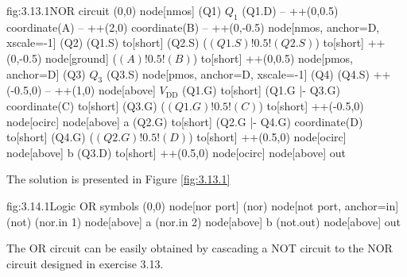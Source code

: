 \begin{circuit}{fig:3.13.1}{NOR circuit}
    (0,0) node[nmos] (Q1) {$Q_1$}
    (Q1.D) -- ++(0,0.5) coordinate(A)
    -- ++(2,0) coordinate(B)
    -- ++(0,-0.5) 
    node[nmos, anchor=D, xscale=-1] (Q2) {}
    (Q1.S) to[short] (Q2.S)
    ($(Q1.S)!0.5!(Q2.S)$) to[short] ++(0,-0.5)
    node[ground] {}
    ($(A)!0.5!(B)$) to[short] ++(0,0.5)
    node[pmos, anchor=D] (Q3) {$Q_3$}
    (Q3.S) node[pmos, anchor=D, xscale=-1] (Q4) {}
    (Q4.S) ++(-0.5,0) -- ++(1,0)
    node[above] {$V_\text{DD}$}
    (Q1.G) to[short] (Q1.G |- Q3.G) coordinate(C)
    to[short] (Q3.G)
    ($(Q1.G)!0.5!(C)$) to[short] ++(-0.5,0)
    node[ocirc] {}
    node[above] {a}
    (Q2.G) to[short] (Q2.G |- Q4.G) coordinate(D)
    to[short] (Q4.G)
    ($(Q2.G)!0.5!(D)$) to[short] ++(0.5,0)
    node[ocirc] {}
    node[above] {b}
    (Q3.D) to[short] ++(0.5,0)
    node[ocirc] {}
    node[above] {out}
\end{circuit}

The solution is presented in Figure \ref{fig:3.13.1}

\begin{circuit}{fig:3.14.1}{Logic OR symbols}
    (0,0) node[nor port] (nor) {}
    node[not port, anchor=in] (not) {}
    (nor.in 1) node[above] {a}
    (nor.in 2) node[above] {b}
    (not.out) node[above] {out}
\end{circuit}

The OR circuit can be easily obtained by cascading a NOT circuit to the NOR circuit designed in exercise 3.13.


